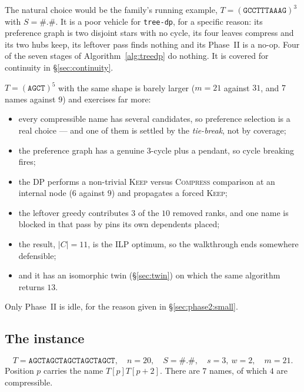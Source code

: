\documentclass[11pt,a4paper]{article}
\theoremstyle{definition}
\theoremstyle{plain}
\theoremstyle{remark}
\newcommand{\KEEP}{\textnormal{\textsc{Keep}}}
\newcommand{\COMP}{\textnormal{\textsc{Compress}}}
\begin{document}
The natural choice would be the family's running example,
$T = (\mathtt{GCCTTTAAAG})^3$ with $S = \mathtt{\#.\#}$. It is a poor
vehicle for \texttt{tree-dp}, for a specific reason: its preference
graph is two disjoint stars with no cycle, its four leaves compress and
its two hubs keep, its leftover pass finds nothing and its Phase~II is a
no-op. Four of the seven stages of Algorithm~\ref{alg:treedp} do
nothing. It is covered for continuity in \S\ref{sec:continuity}.

$T = (\mathtt{AGCT})^5$ with the same shape is barely larger ($m = 21$
against $31$, and $7$ names against $9$) and exercises far more:

\begin{itemize}
\item every compressible name has several candidates, so preference
  selection is a real choice --- and one of them is settled by the
  \emph{tie-break}, not by coverage;
\item the preference graph has a genuine $3$-cycle plus a pendant, so
  cycle breaking fires;
\item the DP performs a non-trivial \KEEP{} versus \COMP{} comparison at
  an internal node ($6$ against $9$) and propagates a forced \KEEP{};
\item the leftover greedy contributes $3$ of the $10$ removed ranks, and
  one name is blocked in that pass by pins its own dependents placed;
\item the result, $|C| = 11$, is the ILP optimum, so the walkthrough
  ends somewhere defensible;
\item and it has an isomorphic twin (\S\ref{sec:twin}) on which the same
  algorithm returns $13$.
\end{itemize}

Only Phase~II is idle, for the reason given in
\S\ref{sec:phase2:small}.

\subsection{The instance}

\[
  T = \mathtt{AGCTAGCTAGCTAGCTAGCT},\quad n = 20,\quad
  S = \mathtt{\#.\#},\quad s = 3,\ w = 2,\quad m = 21 .
\]
Position $p$ carries the name $T[p]T[p{+}2]$. There are $7$ names, of
which $4$ are compressible.
\end{document}
